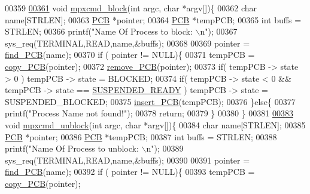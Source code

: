 \begin{DoxyCode}
00359 
\hypertarget{mpx__r2_8c_source_l00361}{}\hyperlink{mpx__r2_8h_ae8eb72663ecff92c27ab06e3560fd0d4}{00361} \textcolor{keywordtype}{void} \hyperlink{mpx__r2_8c_ae8eb72663ecff92c27ab06e3560fd0d4}{mpxcmd_block}(\textcolor{keywordtype}{int} argc, \textcolor{keywordtype}{char} *argv[])\{
00362         \textcolor{keywordtype}{char} name[STRLEN];
00363         \hyperlink{structprocess}{PCB} *pointer;
00364         \hyperlink{structprocess}{PCB} *tempPCB;
00365         \textcolor{keywordtype}{int} buffs = STRLEN;
00366         printf(\textcolor{stringliteral}{"Name Of Process to block: \(\backslash\)n"});
00367         sys\_req(TERMINAL,READ,name,&buffs);
00368         
00369         pointer = \hyperlink{mpx__r2_8c_a612a6abcb66c688a32f33abc93ff3990}{find_PCB}(name);
00370         \textcolor{keywordflow}{if} ( pointer != NULL)\{
00371                 tempPCB = \hyperlink{mpx__r2_8c_aca3ad02d2b4c68f7653b0adf2c484ff6}{copy_PCB}(pointer);
00372                 \hyperlink{mpx__r2_8c_af30a3658210d449b4b53e5be2ed2bc2e}{remove_PCB}(pointer);
00373                 \textcolor{keywordflow}{if}( tempPCB -> state > 0 ) tempPCB -> state = BLOCKED;
00374                 \textcolor{keywordflow}{if}( tempPCB -> state < 0 && tempPCB -> state == \hyperlink{mpx__r2_8h_a07b1141143e8825b04670da23fca8cc7}{SUSPENDED_READY} )
       tempPCB -> state = SUSPENDED\_BLOCKED;
00375                 \hyperlink{mpx__r2_8c_aa3b334e3a5afd6e590917667ad359a6f}{insert_PCB}(tempPCB);
00376         \}\textcolor{keywordflow}{else}\{
00377                 printf(\textcolor{stringliteral}{"Process Name not found!"});
00378                 \textcolor{keywordflow}{return};
00379         \}
00380 \}
00381 
\hypertarget{mpx__r2_8c_source_l00383}{}\hyperlink{mpx__r2_8h_a1363a7b6156a84057936c3fd91d91f69}{00383} \textcolor{keywordtype}{void} \hyperlink{mpx__r2_8c_a1363a7b6156a84057936c3fd91d91f69}{mpxcmd_unblock}(\textcolor{keywordtype}{int} argc, \textcolor{keywordtype}{char} *argv[])\{
00384         \textcolor{keywordtype}{char} name[STRLEN];
00385         \hyperlink{structprocess}{PCB} *pointer;
00386         \hyperlink{structprocess}{PCB} *tempPCB;
00387         \textcolor{keywordtype}{int} buffs = STRLEN;
00388         printf(\textcolor{stringliteral}{"Name Of Process to unblock: \(\backslash\)n"});
00389         sys\_req(TERMINAL,READ,name,&buffs);
00390         
00391         pointer = \hyperlink{mpx__r2_8c_a612a6abcb66c688a32f33abc93ff3990}{find_PCB}(name);
00392         \textcolor{keywordflow}{if} ( pointer != NULL)\{
00393                 tempPCB = \hyperlink{mpx__r2_8c_aca3ad02d2b4c68f7653b0adf2c484ff6}{copy_PCB}(pointer);

\end{DoxyCode}
